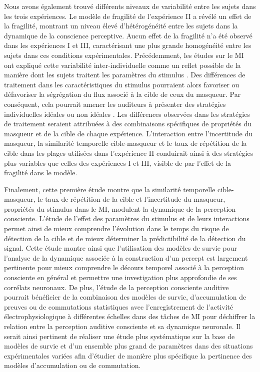 Nous avons également trouvé différents niveaux de variabilité entre les sujets dans les trois expériences. 
Le modèle de fragilité de l'expérience II a révélé un effet de la fragilité, montrant un niveau élevé d'hétérogénéité entre les sujets dans la dynamique de la conscience perceptive. 
Aucun effet de la fragilité n'a été observé dans les expériences I et III, caractérisant une plus grande homogénéité entre les sujets dans ces conditions expérimentales. 
Précédemment, les études sur le MI ont expliqué cette variabilité inter-individuelle comme un reflet possible de la manière dont les sujets traitent les paramètres du stimulus \citep{kidd2008informationalreview, oxenham2003informational}. 
Des différences de traitement dans les caractéristiques du stimulus pourraient alors favoriser ou défavoriser la ségrégation du flux associé à la cible de ceux du masqueur. 
Par conséquent, cela pourrait amener les auditeurs à présenter des stratégies individuelles idéales ou non idéales \citep{kidd2008informationalreview}. 
Les différences observées dans les stratégies de traitement seraient attribuées à des combinaisons spécifiques de propriétés du masqueur et de la cible de chaque expérience. 
L'interaction entre l'incertitude du masqueur, la similarité temporelle cible-masqueur et le taux de répétition de la cible dans les plages utilisées dans l'expérience II conduirait ainsi à des stratégies plus variables que celles des expériences I et III, visible de par l'effet de la fragilité dans le modèle. 

Finalement, cette première étude montre que la similarité temporelle cible-masqueur, le taux de répétition de la cible et l'incertitude du masqueur, propriétés du stimulus dans le MI, modulent la dynamique de la perception consciente. 
L'étude de l'effet des paramètres du stimulus et de leurs interactions permet ainsi de mieux comprendre l'évolution dans le temps du risque de détection de la cible et de mieux déterminer la prédictibilité de la détection du signal. 
Cette étude montre ainsi que l'utilisation des modèles de survie pour l'analyse de la dynamique associée à la construction d'un percept est largement pertinente pour mieux comprendre le décours temporel associé à la perception consciente en général et permettre une investigation plus approfondie de ses corrélats neuronaux. 
De plus, l'étude de la perception consciente auditive pourrait bénéficier de la combinaison des modèles de survie, d'accumulation de preuves ou de commutations statistiques avec l'enregistrement de l'activité électrophysiologique à différentes échelles dans des tâches de MI pour déchiffrer la relation entre la perception auditive consciente et sa dynamique neuronale. 
Il serait ainsi pertinent de réaliser une étude plus systématique sur la base de modèles de survie et d'un ensemble plus grand de paramètres dans des situations expérimentales variées afin d'étudier de manière plus spécifique la pertinence des modèles d'accumulation ou de commutation. 

